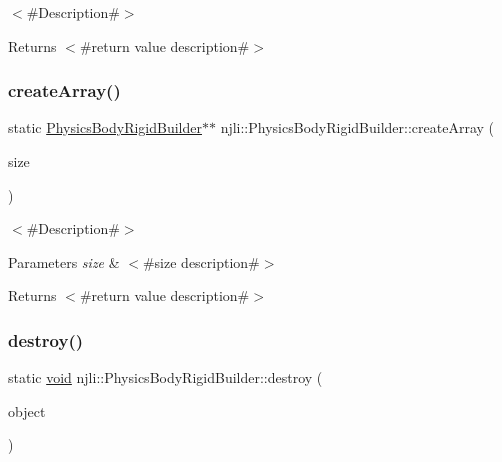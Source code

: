 $<$\#\+Description\#$>$

\begin{DoxyReturn}{Returns}
$<$\#return value description\#$>$ 
\end{DoxyReturn}
\mbox{\label{classnjli_1_1_physics_body_rigid_builder_ab596f9f3c7c403805ed7522c0e2a8d3e}} 
\subsubsection{\texorpdfstring{create\+Array()}{createArray()}}
{\footnotesize\ttfamily static \mbox{\hyperlink{classnjli_1_1_physics_body_rigid_builder}{Physics\+Body\+Rigid\+Builder}}$\ast$$\ast$ njli\+::\+Physics\+Body\+Rigid\+Builder\+::create\+Array (\begin{DoxyParamCaption}\item[{const \mbox{\hyperlink{_util_8h_a10e94b422ef0c20dcdec20d31a1f5049}{u32}}}]{size }\end{DoxyParamCaption})\hspace{0.3cm}{\ttfamily [static]}}

$<$\#\+Description\#$>$


\begin{DoxyParams}{Parameters}
{\em size} & $<$\#size description\#$>$\\
\hline
\end{DoxyParams}
\begin{DoxyReturn}{Returns}
$<$\#return value description\#$>$ 
\end{DoxyReturn}
\mbox{\label{classnjli_1_1_physics_body_rigid_builder_add6f126172e4b520d49594c4e42a0931}} 
\subsubsection{\texorpdfstring{destroy()}{destroy()}}
{\footnotesize\ttfamily static \mbox{\hyperlink{_thread_8h_af1e856da2e658414cb2456cb6f7ebc66}{void}} njli\+::\+Physics\+Body\+Rigid\+Builder\+::destroy (\begin{DoxyParamCaption}\item[{\mbox{\hyperlink{classnjli_1_1_physics_body_rigid_builder}{Physics\+Body\+Rigid\+Builder}} $\ast$}]{object }\end{DoxyParamCaption})\hspace{0.3cm}{\ttfamily [static]}}

